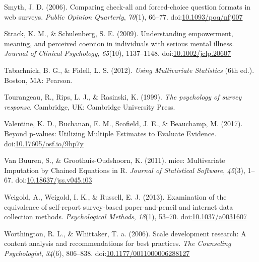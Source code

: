 \documentclass[english,man, mask]{apa6}
\theoremstyle{definition}
\theoremstyle{definition}
\theoremstyle{definition}
\theoremstyle{remark}
\begin{document}
\hypertarget{ref-Smyth2006}{}
Smyth, J. D. (2006). Comparing check-all and forced-choice question
formats in web surveys. \emph{Public Opinion Quarterly}, \emph{70}(1),
66--77.
doi:\href{https://doi.org/10.1093/poq/nfj007}{10.1093/poq/nfj007}

\hypertarget{ref-Strack2009}{}
Strack, K. M., \& Schulenberg, S. E. (2009). Understanding empowerment,
meaning, and perceived coercion in individuals with serious mental
illness. \emph{Journal of Clinical Psychology}, \emph{65}(10),
1137--1148.
doi:\href{https://doi.org/10.1002/jclp.20607}{10.1002/jclp.20607}

\hypertarget{ref-Tabachnick2012}{}
Tabachnick, B. G., \& Fidell, L. S. (2012). \emph{Using Multivariate
Statistics} (6th ed.). Boston, MA: Pearson.

\hypertarget{ref-Tourangeau1999}{}
Tourangeau, R., Rips, L. J., \& Rasinski, K. (1999). \emph{The
psychology of survey response}. Cambridge, UK: Cambridge University
Press.

\hypertarget{ref-Valentine2017}{}
Valentine, K. D., Buchanan, E. M., Scofield, J. E., \& Beauchamp, M.
(2017). Beyond p-values: Utilizing Multiple Estimates to Evaluate
Evidence.
doi:\href{https://doi.org/10.17605/osf.io/9hp7y}{10.17605/osf.io/9hp7y}

\hypertarget{ref-VanBuuren2011}{}
Van Buuren, S., \& Groothuis-Oudshoorn, K. (2011). mice: Multivariate
Imputation by Chained Equations in R. \emph{Journal of Statistical
Software}, \emph{45}(3), 1--67.
doi:\href{https://doi.org/10.18637/jss.v045.i03}{10.18637/jss.v045.i03}

\hypertarget{ref-Weigold2013}{}
Weigold, A., Weigold, I. K., \& Russell, E. J. (2013). Examination of
the equivalence of self-report survey-based paper-and-pencil and
internet data collection methods. \emph{Psychological Methods},
\emph{18}(1), 53--70.
doi:\href{https://doi.org/10.1037/a0031607}{10.1037/a0031607}

\hypertarget{ref-Worthington2006}{}
Worthington, R. L., \& Whittaker, T. a. (2006). Scale development
research: A content analysis and recommendations for best practices.
\emph{The Counseling Psychologist}, \emph{34}(6), 806--838.
doi:\href{https://doi.org/10.1177/0011000006288127}{10.1177/0011000006288127}
\end{document}
